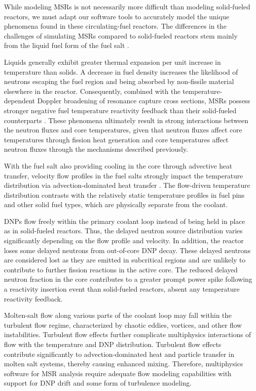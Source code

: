 While modeling \glspl{MSR} is not necessarily more difficult than modeling
solid-fueled reactors, we must adapt our software tools to accurately model the
unique phenomena found in these circulating-fuel reactors. The differences in
the challenges of simulating \glspl{MSR} compared to solid-fueled reactors stem
mainly from the liquid fuel form of the fuel salt \cite{diamond_phenomena_2018,
huff_identifying_2019}.

Liquids generally exhibit greater thermal
expansion per unit increase in temperature than solids. A decrease in fuel density
increases the likelihood of neutrons escaping the fuel region
and being absorbed by non-fissile material elsewhere in the reactor.
Consequently, combined with the temperature-dependent Doppler broadening of
resonance capture cross sections, \glspl{MSR} possess stronger negative fuel
temperature reactivity feedback than their solid-fueled counterparts
\cite{elsheikh_safety_2013}. These
phenomena ultimately result in strong interactions between the neutron fluxes
and core temperatures, given that neutron fluxes affect core temperatures
through fission heat generation and core temperatures affect neutron
fluxes through the mechanisms described previously.

With the fuel salt also providing cooling in the core through advective heat
transfer, velocity flow
profiles in the fuel salts strongly impact the temperature distribution via
advection-dominated heat transfer \cite{diamond_phenomena_2018}. The flow-driven
temperature distribution contrasts
with the relatively static temperature profiles in fuel pins and
other solid fuel types, which are physically separate from the coolant.

\Glspl{DNP} flow freely within the primary coolant loop instead of
being held in place as in solid-fueled reactors. Thus, the delayed neutron
source distribution varies significantly depending on the flow profile and
velocity. In addition, the reactor loses some delayed neutrons from out-of-core
\gls{DNP} decay. These delayed neutrons are considered lost as they are emitted
in subcritical regions and are unlikely to contribute to further fission
reactions in the active core. The reduced delayed neutron fraction in the core
contributes to a greater prompt power spike following a reactivity insertion
event than solid-fueled reactors, absent any temperature reactivity
feedback.

Molten-salt flow along various parts of the coolant loop may fall within the turbulent flow
regime, characterized by chaotic eddies, vortices, and other flow instabilities.
Turbulent flow effects further complicate multiphysics interactions of flow with the temperature
and \gls{DNP} distribution. Turbulent flow effects contribute significantly to advection-dominated
heat and particle transfer in molten salt systems, thereby causing enhanced mixing. Therefore,
multiphysics software for \gls{MSR} analysis require adequate flow modeling capabilities with
support for \gls{DNP} drift and some form of turbulence modeling.

